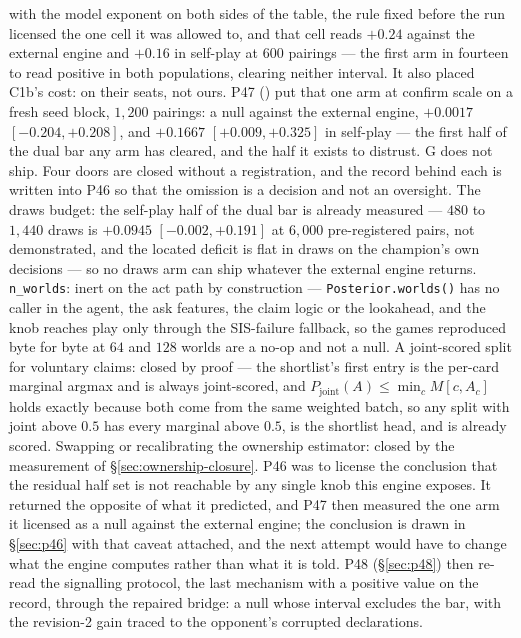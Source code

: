 \documentclass[11pt,letterpaper]{article}
\begin{document}
\begin{itemize}
with the model exponent on both sides of the table, the rule fixed before the
run licensed the one cell it was allowed to, and that cell reads $+0.24$
against the external engine and $+0.16$ in self-play at $600$ pairings --- the first arm
in fourteen to read positive in both populations, clearing neither interval.
It also placed C1b's cost: on their seats, not ours. P47
() put that one arm at confirm scale on
a fresh seed block, $1{,}200$ pairings: a null against the external engine, $+0.0017$
$[-0.204, +0.208]$, and $+0.1667$ $[+0.009, +0.325]$ in self-play --- the
first half of the dual bar any arm has cleared, and the half it exists to
distrust. G does not ship. Four doors are closed without a registration, and the record behind
each is written into P46 so that the omission is a decision and not an
oversight. The draws budget: the self-play
half of the dual bar is already measured --- $480$ to $1{,}440$ draws is
$+0.0945$ $[-0.002, +0.191]$ at $6{,}000$ pre-registered pairs, not
demonstrated, and the located deficit is flat in draws on the champion's own
decisions --- so no draws arm can ship whatever the external engine returns.
\texttt{n\_worlds}: inert on the act path by construction ---
\texttt{Posterior.worlds()} has no caller in the agent, the ask features, the
claim logic or the lookahead, and the knob reaches play only through the
SIS-failure fallback, so the games reproduced byte for byte at $64$ and $128$ worlds are
a no-op and not a null. A joint-scored split for voluntary claims: closed by
proof --- the shortlist's first entry is the per-card marginal argmax and is
always joint-scored, and $P_{\text{joint}}(A) \le \min_c M[c, A_c]$ holds
exactly because both come from the same weighted batch, so any split with
joint above $0.5$ has every marginal above $0.5$, is the shortlist head, and is
already scored. Swapping or recalibrating the ownership estimator: closed by
the measurement of \S\ref{sec:ownership-closure}. P46 was to license the
conclusion that the residual half set is not reachable by any single knob
this engine exposes. It returned the opposite of what it predicted, and P47
then measured the one arm it licensed as a null against the external engine; the
conclusion is drawn in \S\ref{sec:p46} with that caveat attached, and the
next attempt would have to change what the engine computes rather than what
it is told. P48 (\S\ref{sec:p48}) then re-read the signalling protocol, the
last mechanism with a positive value on the record, through the repaired
bridge: a null whose interval excludes the bar, with the revision-2 gain
traced to the opponent's corrupted declarations.
\end{itemize}
\end{document}
